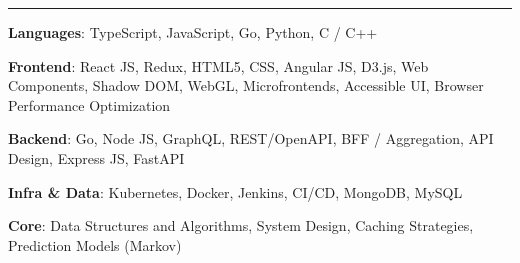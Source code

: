 {\par}\vspace{-8pt}
\noindent\rule{\linewidth}{0.4pt}

\begin{resumeitemize}
    \item \textbf{Languages}: TypeScript, JavaScript, Go, Python, C / C++
    \item \textbf{Frontend}: React JS, Redux, HTML5, CSS, Angular JS, D3.js, Web Components, Shadow DOM, WebGL, Microfrontends, Accessible UI, Browser Performance Optimization
    \item \textbf{Backend}: Go, Node JS, GraphQL, REST/OpenAPI, BFF / Aggregation, API Design, Express JS, FastAPI
    \item \textbf{Infra \& Data}: Kubernetes, Docker, Jenkins, CI/CD, MongoDB, MySQL
    \item \textbf{Core}: Data Structures and Algorithms, System Design, Caching Strategies, Prediction Models (Markov)
\end{resumeitemize}
